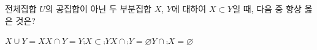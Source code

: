 전체집합 $U$의 공집합이 아닌 두 부분집합 $X$, $Y$에 대하여 $X\subset Y$일 때, 다음 중 항상 옳은 것은?
\begin{choicesii}{$X\cup Y=X$}{$X\cap Y=Y$}{$\comp{X}\subset\comp{Y}$}{$X\cap\comp{Y}=\varnothing$}{$Y\cap\comp{X}=\varnothing$}\end{choicesii}
